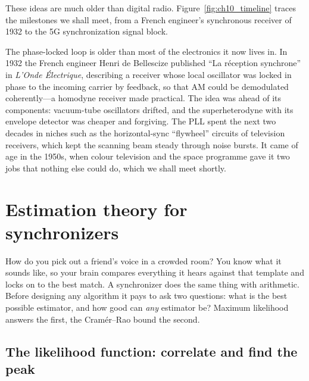 These ideas are much older than digital radio. Figure~\ref{fig:ch10_timeline} traces the
milestones we shall meet, from a French engineer's synchronous receiver of 1932 to the 5G
synchronization signal block.


\begin{history}
The phase-locked loop is older than most of the electronics it now lives in. In 1932 the French
engineer Henri de Bellescize published ``La r\'eception synchrone'' in \emph{L'Onde \'Electrique},
describing a receiver whose local oscillator was locked in phase to the incoming carrier by
feedback, so that AM could be demodulated coherently---a homodyne receiver made practical. The idea
was ahead of its components: vacuum-tube oscillators drifted, and the superheterodyne with its
envelope detector was cheaper and forgiving. The PLL spent the next two decades in niches such as
the horizontal-sync ``flywheel'' circuits of television receivers, which kept the scanning beam
steady through noise bursts. It came of age in the 1950s, when colour television and the space
programme gave it two jobs that nothing else could do, which we shall meet shortly.
\end{history}

\section{Estimation theory for synchronizers}
\label{sec:ch10:estimation}

How do you pick out a friend's voice in a crowded room? You know what it sounds like, so your
brain compares everything it hears against that template and locks on to the best match. A
synchronizer does the same thing with arithmetic. Before designing any algorithm it pays to ask
two questions: what is the best possible estimator, and how good can \emph{any} estimator be?
Maximum likelihood answers the first, the Cram\'er--Rao bound the second.

\subsection{The likelihood function: correlate and find the peak}

